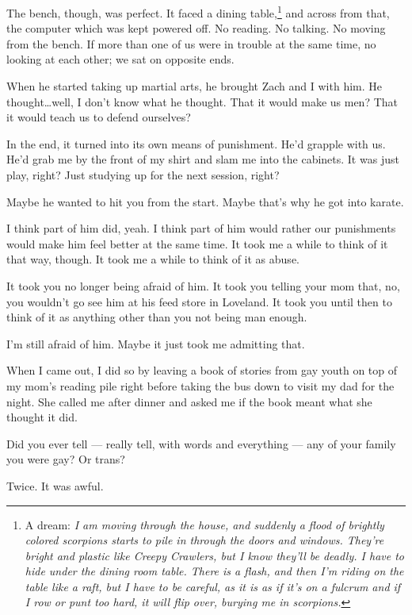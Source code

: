 The bench, though, was perfect. It faced a dining table,\footnote{A dream: \emph{I am moving through the house, and suddenly a flood of brightly colored scorpions starts to pile in through the doors and windows. They're bright and plastic like Creepy Crawlers, but I know they'll be deadly. I have to hide under the dining room table. There is a flash, and then I'm riding on the table like a raft, but I have to be careful, as it is as if it's on a fulcrum and if I row or punt too hard, it will flip over, burying me in scorpions.}} and across from that, the computer which was kept powered off. No reading. No talking. No moving from the bench. If more than one of us were in trouble at the same time, no looking at each other; we sat on opposite ends.

When he started taking up martial arts, he brought Zach and I with him. He thought\ldots{}well, I don't know what he thought. That it would make us men? That it would teach us to defend ourselves?

In the end, it turned into its own means of punishment. He'd grapple with us. He'd grab me by the front of my shirt and slam me into the cabinets. It was just play, right? Just studying up for the next session, right?

\begin{ally}
Maybe he wanted to hit you from the start. Maybe that's why he got into karate.
\end{ally}
I think part of him did, yeah. I think part of him would rather our punishments would make him feel better at the same time. It took me a while to think of it that way, though. It took me a while to think of it as abuse.

\begin{ally}
It took you no longer being afraid of him. It took you telling your mom that, no, you wouldn't go see him at his feed store in Loveland. It took you until then to think of it as anything other than you not being man enough.
\end{ally}
I'm still afraid of him. Maybe it just took me admitting that.
\newpage

\noindent When I came out, I did so by leaving a book of stories from gay youth on top of my mom's reading pile right before taking the bus down to visit my dad for the night. She called me after dinner and asked me if the book meant what she thought it did.

\begin{ally}
Did you ever tell --- really tell, with words and everything --- any of your family you were gay? Or trans?
\end{ally}
Twice. It was awful.

